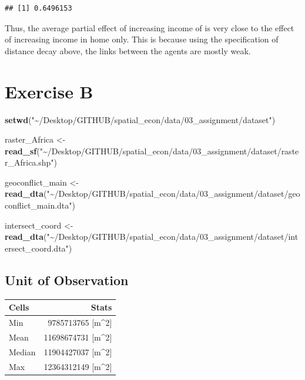 \documentclass[
  a4paper,
]{article}
\newenvironment{Shaded}{\begin{snugshade}}{\end{snugshade}}
\newcommand{\FunctionTok}[1]{\textcolor[rgb]{0.13,0.29,0.53}{\textbf{#1}}}
\newcommand{\NormalTok}[1]{#1}
\newcommand{\OtherTok}[1]{\textcolor[rgb]{0.56,0.35,0.01}{#1}}
\newcommand{\StringTok}[1]{\textcolor[rgb]{0.31,0.60,0.02}{#1}}
\begin{document}
\begin{verbatim}
## [1] 0.6496153
\end{verbatim}

Thus, the average partial effect of increasing income of is very close
to the effect of increasing income in home only. This is because using
the specification of distance decay above, the links between the agents
are mostly weak.

\hypertarget{exercise-b}{%
\section{Exercise B}\label{exercise-b}}

\begin{Shaded}
\begin{Highlighting}[]
\FunctionTok{setwd}\NormalTok{(}\StringTok{"\textasciitilde{}/Desktop/GITHUB/spatial\_econ/data/03\_assignment/dataset"}\NormalTok{)}

\NormalTok{raster\_Africa }\OtherTok{\textless{}{-}} \FunctionTok{read\_sf}\NormalTok{(}\StringTok{"\textasciitilde{}/Desktop/GITHUB/spatial\_econ/data/03\_assignment/dataset/raster\_Africa.shp"}\NormalTok{)}

\NormalTok{geoconflict\_main }\OtherTok{\textless{}{-}} \FunctionTok{read\_dta}\NormalTok{(}\StringTok{"\textasciitilde{}/Desktop/GITHUB/spatial\_econ/data/03\_assignment/dataset/geoconflict\_main.dta"}\NormalTok{)}

\NormalTok{intersect\_coord }\OtherTok{\textless{}{-}} \FunctionTok{read\_dta}\NormalTok{(}\StringTok{"\textasciitilde{}/Desktop/GITHUB/spatial\_econ/data/03\_assignment/dataset/intersect\_coord.dta"}\NormalTok{)}
\end{Highlighting}
\end{Shaded}

\hypertarget{unit-of-observation}{%
\subsection{Unit of Observation}\label{unit-of-observation}}

\begin{tabular}{l|r}
\hline
Cells & Stats\\
\hline
Min & 9785713765 [m\textasciicircum{}2]\\
\hline
Mean & 11698674731 [m\textasciicircum{}2]\\
\hline
Median & 11904427037 [m\textasciicircum{}2]\\
\hline
Max & 12364312149 [m\textasciicircum{}2]\\
\hline
\end{tabular}
\end{document}

